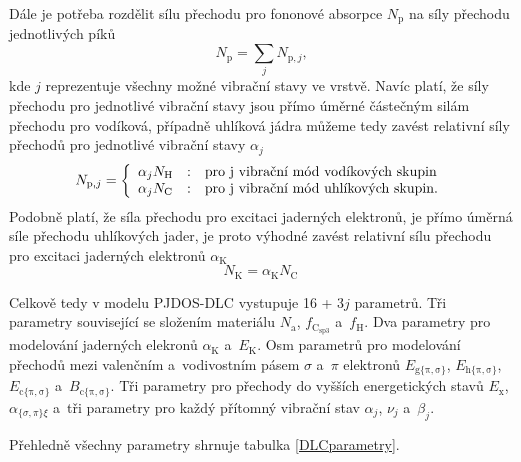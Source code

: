Dále je potřeba rozdělit sílu přechodu pro fononové absorpce $N_\mathrm{p}$ na síly přechodu jednotlivých píků
\begin{equation}
N_\mathrm{p} = \sum_j N_{\mathrm{p},j} \text{,}
\end{equation}
kde $j$ reprezentuje všechny možné vibrační stavy ve vrstvě. Navíc platí, že síly přechodu pro jednotlivé vibrační stavy jsou přímo úměrné částečným silám přechodu pro vodíková, případně uhlíková jádra můžeme tedy zavést relativní síly přechodů pro jednotlivé vibrační stavy $\alpha_j$
\begin{equation}
N_{\mathrm{p},j} = 
	\left\{\begin{array}{l c l} 
	\alpha_j N_\mathrm{H} & : & \text{pro j vibrační mód vodíkových skupin} \\
	\alpha_j N_\mathrm{C} & : & \text{pro j vibrační mód uhlíkových skupin.}\end{array} \right.
\label{reltransstr}
\end{equation}
Podobně platí, že síla přechodu pro excitaci jaderných elektronů, je přímo úměrná síle přechodu uhlíkových jader, je proto výhodné zavést relativní sílu přechodu pro excitaci jaderných elektronů $\alpha_\mathrm{K}$
\begin{equation}
N_\mathrm{K} =  \alpha_\mathrm{K} N_\mathrm{C}
\end{equation}

Celkově tedy v modelu PJDOS-DLC vystupuje 16 + 3$j$ parametrů. Tři parametry související se složením materiálu $N_\mathrm{a}$, $f_\mathrm{C_{sp3}}$ a~$f_\mathrm{H}$. Dva parametry pro modelování jaderných elekronů $\alpha_\mathrm{K}$ a~$E_\mathrm{K}$. Osm parametrů pro modelování přechodů mezi valenčním a~vodivostním pásem $\sigma$ a~$\pi$ elektronů $E_\mathrm{g\{\pi,\sigma\}}$, $E_\mathrm{h\{\pi,\sigma\}}$, $E_\mathrm{c\{\pi,\sigma\}}$ a~$B_\mathrm{c\{\pi,\sigma\}}$. Tři parametry pro přechody do vyšších energetických stavů $E_\mathrm{x}$, $\alpha_{\{\sigma,\pi\}\xi}$ a~tři parametry pro každý přítomný vibrační stav $\alpha_j$, $\nu_j$ a~$\beta_j$.

Přehledně všechny parametry shrnuje tabulka \ref{DLCparametry}.


